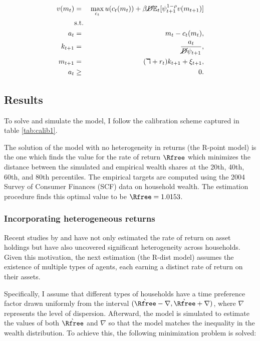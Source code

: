 \documentclass[\econtexRoot/Chp1proposal]{subfiles}
\begin{document}
\begin{eqnarray*}
  v(m_t) &=& \max_{c_t} u(c_t(m_t)) + \beta \cancel{D} \mathbb{E}_{t}[\psi_{t+1}^{1-\rho}v(m_{t+1})] \\
  &\text{s.t.}& \\
  a_t &=& m_t - c_t(m_t), \\
  k_{t+1} &=& \frac{a_t}{\cancel{D}\psi_{t+1}}, \\
  m_{t+1} &=& (\daleth + r_t)k_{t+1} + \xi_{t+1}, \\
  a_t &\geq& 0.
\end{eqnarray*}

\subsection{Results}
\par To solve and simulate the model, I follow the calibration scheme captured in table \ref{tab:calib1}.
\unskip

\par The solution of the model with no heterogeneity in returns (the R-point model) is the one which finds the value for the rate of return $\Rfree$ which minimizes the distance between the simulated and empirical wealth shares at the 20th, 40th, 60th, and 80th percentiles. The empirical targets are computed using the 2004 Survey of Consumer Finances (SCF) data on household wealth. The estimation procedure finds this optimal value to be $\Rfree = 1.0153$.

\subsubsection{Incorporating heterogeneous returns}

\par Recent studies by \cite{aflgdmlp20} and \cite{lblcps18} have not only estimated the rate of return on asset holdings but have also uncovered significant heterogeneity across households. Given this motivation, the next estimation (the R-dist model) assumes the existence of multiple types of agents, each earning a distinct rate of return on their assets.

\par Specifically, I assume that different types of households have a time preference factor drawn uniformly from the interval $(\grave{\Rfree} - \nabla, \grave{\Rfree} + \nabla)$, where $\nabla$ represents the level of dispersion. Afterward, the model is simulated to estimate the values of both $\grave{\Rfree}$ and $\nabla$ so that the model matches the inequality in the wealth distribution. To achieve this, the following minimization problem is solved:
\end{document}
